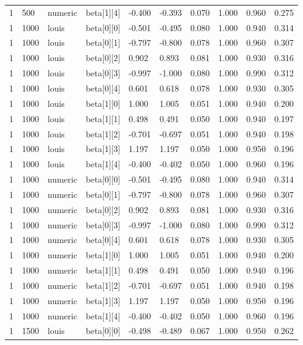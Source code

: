 \begin{table}
\begin{tabular}{llllllllll}
1 & 500 & numeric & beta[1][4] & -0.400 & -0.393 & 0.070 & 1.000 & 0.960 & 0.275 \\
1 & 1000 & louis & beta[0][0] & -0.501 & -0.495 & 0.080 & 1.000 & 0.940 & 0.314 \\
1 & 1000 & louis & beta[0][1] & -0.797 & -0.800 & 0.078 & 1.000 & 0.960 & 0.307 \\
1 & 1000 & louis & beta[0][2] & 0.902 & 0.893 & 0.081 & 1.000 & 0.930 & 0.316 \\
1 & 1000 & louis & beta[0][3] & -0.997 & -1.000 & 0.080 & 1.000 & 0.990 & 0.312 \\
1 & 1000 & louis & beta[0][4] & 0.601 & 0.618 & 0.078 & 1.000 & 0.930 & 0.305 \\
1 & 1000 & louis & beta[1][0] & 1.000 & 1.005 & 0.051 & 1.000 & 0.940 & 0.200 \\
1 & 1000 & louis & beta[1][1] & 0.498 & 0.491 & 0.050 & 1.000 & 0.940 & 0.197 \\
1 & 1000 & louis & beta[1][2] & -0.701 & -0.697 & 0.051 & 1.000 & 0.940 & 0.198 \\
1 & 1000 & louis & beta[1][3] & 1.197 & 1.197 & 0.050 & 1.000 & 0.950 & 0.196 \\
1 & 1000 & louis & beta[1][4] & -0.400 & -0.402 & 0.050 & 1.000 & 0.960 & 0.196 \\
1 & 1000 & numeric & beta[0][0] & -0.501 & -0.495 & 0.080 & 1.000 & 0.940 & 0.314 \\
1 & 1000 & numeric & beta[0][1] & -0.797 & -0.800 & 0.078 & 1.000 & 0.960 & 0.307 \\
1 & 1000 & numeric & beta[0][2] & 0.902 & 0.893 & 0.081 & 1.000 & 0.930 & 0.316 \\
1 & 1000 & numeric & beta[0][3] & -0.997 & -1.000 & 0.080 & 1.000 & 0.990 & 0.312 \\
1 & 1000 & numeric & beta[0][4] & 0.601 & 0.618 & 0.078 & 1.000 & 0.930 & 0.305 \\
1 & 1000 & numeric & beta[1][0] & 1.000 & 1.005 & 0.051 & 1.000 & 0.940 & 0.200 \\
1 & 1000 & numeric & beta[1][1] & 0.498 & 0.491 & 0.050 & 1.000 & 0.940 & 0.196 \\
1 & 1000 & numeric & beta[1][2] & -0.701 & -0.697 & 0.051 & 1.000 & 0.940 & 0.198 \\
1 & 1000 & numeric & beta[1][3] & 1.197 & 1.197 & 0.050 & 1.000 & 0.950 & 0.196 \\
1 & 1000 & numeric & beta[1][4] & -0.400 & -0.402 & 0.050 & 1.000 & 0.960 & 0.196 \\
1 & 1500 & louis & beta[0][0] & -0.498 & -0.489 & 0.067 & 1.000 & 0.950 & 0.262 \\

\end{tabular}
\end{table}
